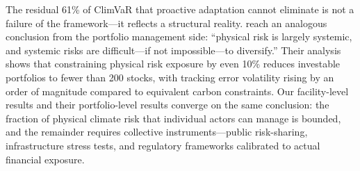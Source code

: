 \begin{twocolbody}
The residual 61\% of ClimVaR that proactive adaptation cannot eliminate is not a failure of the framework---it reflects a structural reality. \citet{luciani2026} reach an analogous conclusion from the portfolio management side: ``physical risk is largely systemic, and systemic risks are difficult---if not impossible---to diversify.'' Their analysis shows that constraining physical risk exposure by even 10\% reduces investable portfolios to fewer than 200 stocks, with tracking error volatility rising by an order of magnitude compared to equivalent carbon constraints. Our facility-level results and their portfolio-level results converge on the same conclusion: the fraction of physical climate risk that individual actors can manage is bounded, and the remainder requires collective instruments---public risk-sharing, infrastructure stress tests, and regulatory frameworks calibrated to actual financial exposure.

\end{twocolbody}